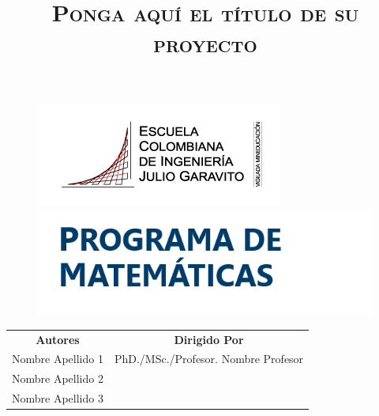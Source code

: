 \documentclass[12pt, oneside]{article}
\begin{document}
\setmargins{2cm}{1cm}{18cm}{23.42cm}{10pt}{1cm}{0pt}{1cm}

\begin{figure}[t]
\begin{minipage}{0.5\textwidth}\large
\begin{flushleft}
\includegraphics[scale=0.7]{logoECI.png} %
\end{flushleft}
\end{minipage}
\begin{minipage}{0.5\textwidth}\large
\begin{flushright}
\includegraphics[scale=0.75]{MATH.png} %
\end{flushright}
\end{minipage}
\end{figure}

\title{\textsc{Ponga aquí el título de su proyecto}} %
\date{}
\maketitle
\begin{center}
\begin{tabular}{cc}
\textbf{Autores} & \textbf{Dirigido Por} \\

Nombre Apellido 1 & PhD./MSc./Profesor. Nombre Profesor\\ %
Nombre Apellido 2  &  \\
Nombre Apellido 3 & \\		
\end{tabular}
\end{center}
\vspace{1cm}
\end{document}
